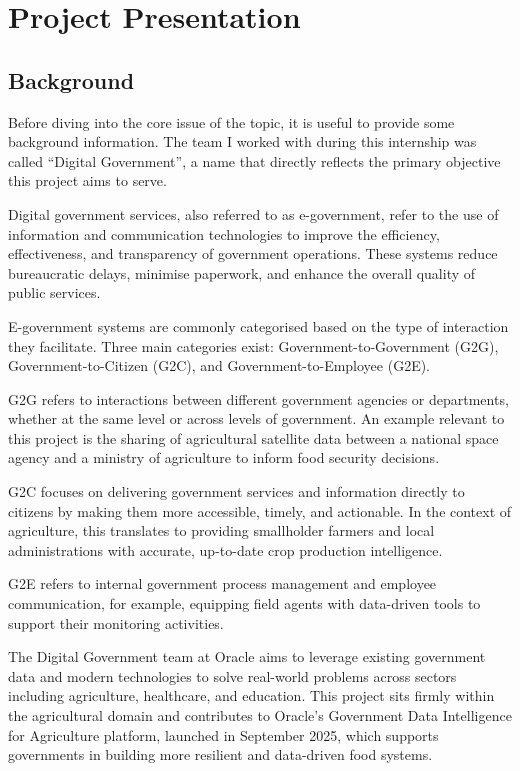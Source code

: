 \section{Project Presentation}
\label{sec:proj_pres}

\subsection{Background}
\label{sec:into_back}

Before diving into the core issue of the topic, it is useful to provide some
background information. The team I worked with during this internship was called
``Digital Government'', a name that directly reflects the primary objective
this project aims to serve.

Digital government services, also referred to as e-government, refer to
the use of information and communication technologies to improve the efficiency,
effectiveness, and transparency of government operations. These systems reduce
bureaucratic delays, minimise paperwork, and enhance the overall quality of
public services.

E-government systems are commonly categorised based on the type of interaction
they facilitate. Three main categories exist: Government-to-Government (G2G),
Government-to-Citizen (G2C), and Government-to-Employee (G2E).

G2G refers to interactions between different government agencies or departments,
whether at the same level or across levels of government. An example relevant to
this project is the sharing of agricultural satellite data between a national
space agency and a ministry of agriculture to inform food security decisions.

G2C focuses on delivering government services and information directly to
citizens by making them more accessible, timely, and actionable. In the context
of agriculture, this translates to providing smallholder farmers and local
administrations with accurate, up-to-date crop production intelligence.

G2E refers to internal government process management and employee communication,
for example, equipping field agents with data-driven tools to support their
monitoring activities.

The Digital Government team at Oracle aims to leverage existing government data
and modern technologies to solve real-world problems across sectors including
agriculture, healthcare, and education. This project sits firmly within the
agricultural domain and contributes to Oracle's Government Data Intelligence for
Agriculture platform, launched in September 2025, which supports
governments in building more resilient and data-driven food systems.

